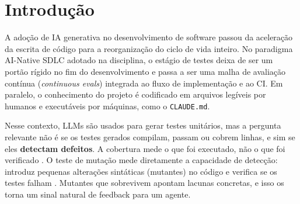\documentclass[12pt]{article}
\begin{document}
{\renewcommand{\abstractname}{Abstract}\begin{abstract}
\noindent Line coverage is a weak proxy for test quality, and LLM-generated tests often cover code
without detecting faults. We present a mutation-guided continuous-evals loop for LLM test generation: an agent writes
Vitest tests for real TypeScript libraries, Stryker computes the mutation score, and surviving mutants are fed back to
the agent in a GitHub Actions pipeline. The design compares five conditions (human tests, zero-shot, project
conventions, equal-budget independent sampling, and feedback loop), uses a mutant hold-out split and guardrails against
trivial tests. We release the framework, the statistical protocol, a measured human baseline over 9 modules from 4
libraries, and a first run of the four LLM conditions (\texttt{gemini-3.5-flash-lite}, 3 repetitions per module). The
feedback loop (C3) had the highest median mutation score on the held-out mutants (80.3\%, versus 70.0\% for C1, 76.1\% for
C2 and 79.0\% for C2r). With equal budget, however, the advantage over C2r (4.0 percentage points) is not distinguishable
from zero (one-sided paired Wilcoxon, adjusted $p=0.109$, $n=8$ modules), so H1 is \textbf{not supported}; only the
comparison with C2 is significant (adjusted $p=0.047$, $n=6$). Line coverage reaches 100\% in every LLM condition, and the
share of runs with at least one valid test ranges from 63.0\% (C2) to 88.9\% (C2r). With 9 modules the results have low
power and should be read as exploratory.
\end{abstract}}

\section{Introdução}

A adoção de IA generativa no desenvolvimento de software passou da aceleração da escrita de código para a
reorganização do ciclo de vida inteiro. No paradigma AI-Native SDLC adotado na disciplina, o estágio de testes deixa
de ser um portão rígido no fim do desenvolvimento e passa a ser uma malha de avaliação contínua (\textit{continuous
evals}) integrada ao fluxo de implementação e ao CI. Em paralelo, o conhecimento do projeto é codificado em arquivos
legíveis por humanos e executáveis por máquinas, como o \texttt{CLAUDE.md}.

Nesse contexto, LLMs são usados para gerar testes unitários, mas a pergunta relevante não é se os testes gerados
compilam, passam ou cobrem linhas, e sim se eles \textbf{detectam defeitos}. A cobertura mede o que foi executado, não o que
foi verificado \cite{inozemtseva2014}. O teste de mutação mede diretamente a capacidade de detecção: introduz pequenas
alterações sintáticas (mutantes) no código e verifica se os testes falham \cite{jia2011,papadakis2019}. Mutantes que
sobrevivem apontam lacunas concretas, e isso os torna um sinal natural de feedback para um agente.
\end{document}
